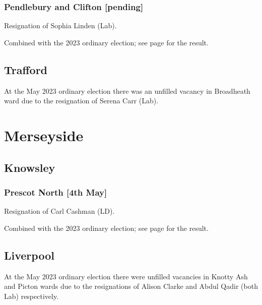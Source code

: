 \documentclass[a4paper,openany]{book}
\begin{document}
\begin{resultsiii}
\subsubsection*{Pendlebury and Clifton \hspace*{\fill}\nolinebreak[1]%
	\enspace\hspace*{\fill}
	[pending]}


Resignation of Sophia Linden (Lab).

Combined with the 2023 ordinary election; see page \pageref{PendleburyCliftonSalford} for the result.

\subsection*{Trafford}

At the May 2023 ordinary election there was an unfilled vacancy in Broadheath ward due to the resignation of Serena Carr (Lab).%

\section{Merseyside}

\subsection*{Knowsley}

\subsubsection*{Prescot North \hspace*{\fill}\nolinebreak[1]%
	\enspace\hspace*{\fill}
	[4th May]}


Resignation of Carl Cashman (LD).

Combined with the 2023 ordinary election; see page \pageref{KnowsleyPrescotNorth} for the result.

\subsection*{Liverpool}

At the May 2023 ordinary election there were unfilled vacancies in Knotty Ash and Picton wards due to the resignations of Alison Clarke and Abdul Qadir (both Lab) respectively.%
%


\end{resultsiii}
\end{document}
